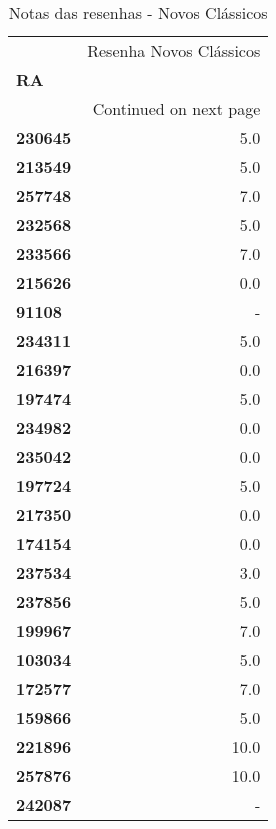 \documentclass[11pt]{article}
\begin{document}
\begin{center}
\begin{longtable}{lr}
\caption{Notas das resenhas - Novos Clássicos}\\
\toprule
{} &  Resenha Novos Clássicos \\
\textbf{RA    } &                          \\
\midrule
\endhead
\midrule
\multicolumn{2}{r}{{Continued on next page}} \\
\midrule
\endfoot

\bottomrule
\endlastfoot
\textbf{230645} &                      5.0 \\
\textbf{213549} &                      5.0 \\
\textbf{257748} &                      7.0 \\
\textbf{232568} &                      5.0 \\
\textbf{233566} &                      7.0 \\
\textbf{215626} &                      0.0 \\
\textbf{91108 } &                        - \\
\textbf{234311} &                      5.0 \\
\textbf{216397} &                      0.0 \\
\textbf{197474} &                      5.0 \\
\textbf{234982} &                      0.0 \\
\textbf{235042} &                      0.0 \\
\textbf{197724} &                      5.0 \\
\textbf{217350} &                      0.0 \\
\textbf{174154} &                      0.0 \\
\textbf{237534} &                      3.0 \\
\textbf{237856} &                      5.0 \\
\textbf{199967} &                      7.0 \\
\textbf{103034} &                      5.0 \\
\textbf{172577} &                      7.0 \\
\textbf{159866} &                      5.0 \\
\textbf{221896} &                     10.0 \\
\textbf{257876} &                     10.0 \\
\textbf{242087} &                        - \\

\end{longtable}
\end{center}
\end{document}
